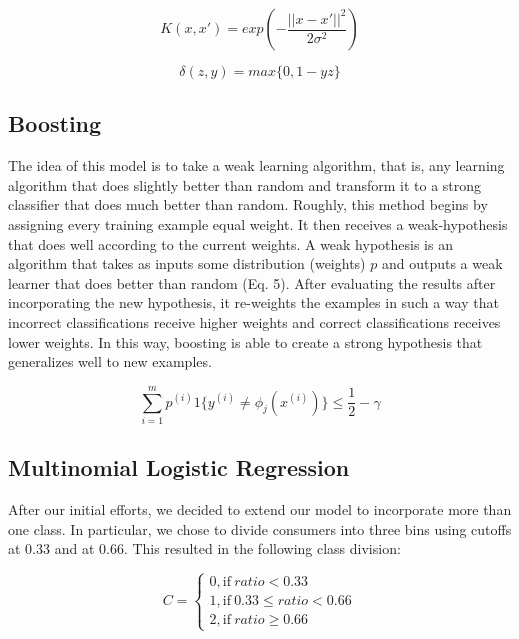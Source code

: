 \documentclass[conference]{IEEEtran}
\begin{document}
\begin{equation}
K(x,x') = exp (-\frac{||x-x'||^2}{2\sigma^2})
\end{equation}

\begin{equation}
\delta(z,y) = max \{0,1-yz\}
\end{equation}

\subsection{Boosting}
The idea of this model is to take a weak learning algorithm, that is, any learning algorithm that does slightly better than random and transform it to a strong classifier that does much better than random. Roughly, this method begins by assigning every training example equal weight. It then receives a weak-hypothesis that does well according to the current weights. A weak hypothesis is an algorithm that takes as inputs some distribution (weights) $p$ and outputs a weak learner that does better than random (Eq. 5). After evaluating the results after incorporating the new hypothesis, it re-weights the examples in such a way that incorrect classifications receive higher weights and correct classifications receives lower weights. In this way, boosting is able to create a strong hypothesis that generalizes well to new examples.

\begin{equation}
\sum_{i=1}^{m} p^{(i)} 1 \{y^{(i)} \neq \phi_j(x^{(i)})\}  \leq \frac{1}{2} - \gamma
\end{equation}

\subsection{Multinomial Logistic Regression}
After our initial efforts, we decided to extend our model to incorporate more than one class. In particular, we chose to divide consumers into three bins using cutoffs at 0.33 and at 0.66. This resulted in the following class division:

\begin{equation}
C=
\begin{cases}
0, \text{if}\ ratio < 0.33 \\
1, \text{if}\ 0.33 \leq ratio < 0.66 \\
2, \text{if}\ ratio \geq 0.66
\end{cases}
\end{equation}
\end{document}
